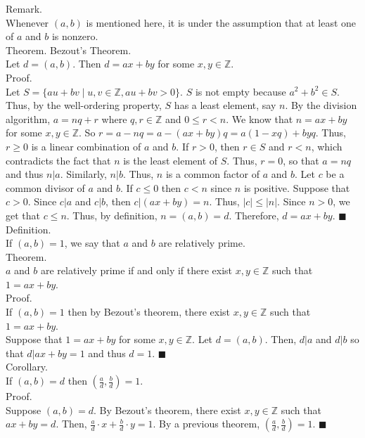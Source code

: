 \documentclass[twocolumn]{article}
\newcommand{\qed}{$\blacksquare$}
\newcommand{\integers}{\mathbb{Z}}
\begin{document}
Remark. \\
Whenever $(a, b)$ is mentioned here, it is under the assumption that at least one of $a$ and $b$ is nonzero. \\

Theorem. Bezout's Theorem. \\
Let $d = (a, b)$. Then $d = ax + by$ for some $x, y \in \integers$. \\
Proof. \\
Let $S = \{ au + bv \mid u, v \in \integers, au + bv > 0 \}$. $S$ is not empty because $a^2 + b^2 \in S$. Thus, by the well-ordering property, $S$ has a least element, say $n$. By the division algorithm, $a = nq + r$ where $q, r \in \integers$ and $0 \leq r < n$. We know that $n = ax + by$ for some $x, y \in \integers$. So $r = a - nq = a - (ax + by)q = a(1 - xq) + byq$. Thus, $r \geq 0$ is a linear combination of $a$ and $b$. If $r > 0$, then $r \in S$ and $r < n$, which contradicts the fact that $n$ is the least element of $S$. Thus, $r = 0$, so that $a = nq$ and thus $n | a$. Similarly, $n | b$. Thus, $n$ is a common factor of $a$ and $b$. Let $c$ be a common divisor of $a$ and $b$. If $c \leq 0$ then $c < n$ since $n$ is positive. Suppose that $c > 0$. Since $c | a$ and $c | b$, then $c | (ax + by) = n$. Thus, $|c| \leq |n|$. Since $n > 0$, we get that $c \leq n$. Thus, by definition, $n = (a, b) = d$. Therefore, $d = ax + by$. \qed \\

Definition. \\
If $(a, b) = 1$, we say that $a$ and $b$ are relatively prime. \\

Theorem. \\
$a$ and $b$ are relatively prime if and only if there exist $x, y \in \integers$ such that $1 = ax + by$. \\
Proof. \\
If $(a, b) = 1$ then by Bezout's theorem, there exist $x, y \in \integers$ such that $1 = ax + by$. \\
Suppose that $1 = ax + by$ for some $x, y \in \integers$. Let $d = (a, b)$. Then, $d | a$ and $d | b$ so that $d | ax + by = 1$ and thus $d = 1$. \qed \\

Corollary. \\
If $(a, b) = d$ then $\left( \frac{a}{d}, \frac{b}{d} \right) = 1$. \\
Proof. \\
Suppose $(a, b) = d$. By Bezout's theorem, there exist $x, y \in \integers$ such that $ax + by = d$. Then, $\frac{a}{d} \cdot x + \frac{b}{d} \cdot y = 1$. By a previous theorem, $\left( \frac{a}{d}, \frac{b}{d} \right) = 1$. \qed \\
\end{document}
